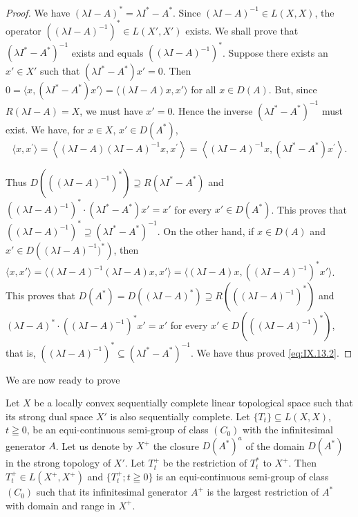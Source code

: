 \begin{proof}
 We have $(\lambda I - A)^{*} = \lambda I^{*} - A^{*}$. Since $(\lambda I - A)^{-1} \in L(X, X)$, the operator $((\lambda I - A)^{-1})^{*} \in L(X', X')$ exists. We shall prove that $(\lambda I^{*} - A^{*})^{-1}$ exists and equals $((\lambda I - A)^{-1})^{*}$. Suppose there exists an $x' \in X'$ such that $(\lambda I^{*} - A^{*}) x' = 0$. Then $0 = \langle x, (\lambda I^{*} - A^{*}) x' \rangle = \langle (\lambda I - A) x, x' \rangle$ for all $x \in D(A)$. But, since $R(\lambda I - A) = X$, we must have $x' = 0$. Hence the inverse $(\lambda I^{*} - A^{*})^{-1}$ must exist. We have, for $x \in X$, $x' \in D(A^{*})$, 
\[
\langle x, x ^{\prime} \rangle = \left\langle (\lambda I - A) (\lambda I - A) ^{-1} x, x ^{\prime} \right\rangle = \left\langle (\lambda I - A) ^{-1} x, (\lambda I ^{*} - A ^{*}) x ^{\prime} \right\rangle . \]

Thus $D(((\lambda I - A)^{-1})^*) \supseteq R(\lambda I^* - A^*)$ and $((\lambda I - A)^{-1})^* \cdot (\lambda I^* - A^*) x' = x'$ for every $x' \in D(A^*)$. This proves that $((\lambda I - A)^{-1})^* \supseteq (\lambda I^* - A^*)^{-1}$. On the other hand, if $x \in D(A)$ and $x' \in D\left((\lambda I - A)^{-1})^*\right)$, then 
$\langle x, x' \rangle = \langle (\lambda I - A)^{-1} (\lambda I - A) x, x' \rangle = \langle (\lambda I - A) x, ((\lambda I - A)^{-1})^* x' \rangle$. This proves that $D(A^*) = D((\lambda I - A)^*) \supseteq R(((\lambda I - A)^{-1})^*)$ and $(\lambda I - A)^* \cdot ((\lambda I - A)^{-1})^* x' = x'$ for every $x' \in D(((\lambda I - A)^{-1})^*)$, that is, $((\lambda I - A)^{-1})^* \subseteq (\lambda I^* - A^*)^{-1}$. We have thus proved \eqref{eq:IX.13.2}. 
\end{proof}

We are now ready to prove 

\begin{theoremu} Let $X$ be a locally convex sequentially complete linear topological space such that its strong dual space $X'$ is also sequentially complete. Let $\{T_{t}\} \subseteq L(X, X)$, $t \geqq 0$, be an equi-continuous semi-group of class $(C_{0})$ with the infinitesimal generator $A$. Let us denote by $X^{+}$ the closure $D(A^{*})^{a}$ of the domain $D(A^{*})$ in the strong topology of $X'$. Let $T_{t}^{+}$ be the restriction of $T_{t}^{*}$ to $X^{+}$. Then $T_{t}^{+} \in L(X^{+}, X^{+})$ and $\{T_{t}^{+}; t \geqq 0\}$ is an equi-continuous semi-group of class $(C_{0})$ such that its infinitesimal generator $A^{+}$ is the largest restriction of $A^{*}$ with domain and range in $X^{+}$. 
\end{theoremu}

